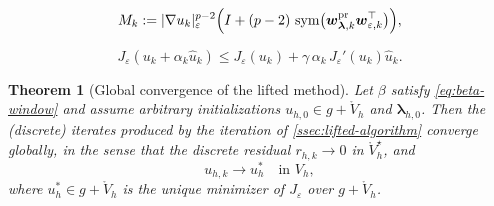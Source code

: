 \documentclass[10pt,a4paper]{amsart}
\newtheorem{theorem}{Theorem}
\newcommand{\bs}[1]{\ensuremath{\boldsymbol{#1}}}
\DeclareMathOperator{\sym}{sym}
\begin{document}
\begin{equation}\label{eq:Mk}
  M_k:=|\nabla u_k|_\varepsilon^{p-2}\Bigl(I+(p-2)\,\sym\bigl(\bs w_{\bs\lambda,k}^{\mathrm{pr}}\bs w_{\varepsilon,k}^\top\bigr)\Bigr),
\end{equation}

\begin{equation}\label{eq:armijo}
  J_\varepsilon(u_k+\alpha_k\hat u_k)\le J_\varepsilon(u_k)+\gamma\,\alpha_k\,J_\varepsilon'(u_k)\hat u_k.
\end{equation}

\begin{theorem}[Global convergence of the lifted method]
\label{thm:finite-dimensional-lifted-global-convergence}
Let $\beta$ satisfy \eqref{eq:beta-window} and assume arbitrary initializations $u_{h,0}\in g+\mathring{V}_{h}$
and 
$\bs\lambda_{h,0}$. 
Then the (discrete) iterates produced by the iteration of \cref{ssec:lifted-algorithm} converge globally, in the sense that the discrete residual
$r_{h,k}\to 0$ in $\mathring{V}_{h}^\star$,
and
\begin{equation*}
  u_{h,k}\to u_h^* \quad\text{in }V_h,
\end{equation*}
where $u_h^*\in g+\mathring{V}_{h}$ is the unique minimizer of $J_\varepsilon$ over $g+\mathring{V}_{h}$.
\end{theorem}
\end{document}
